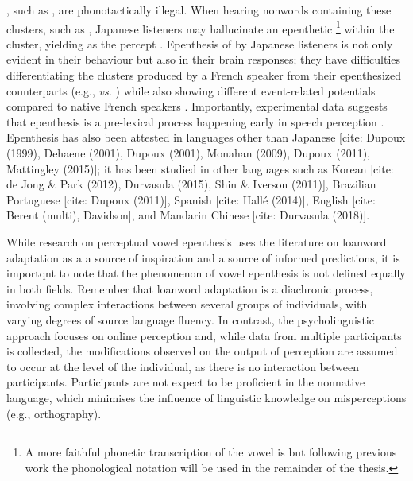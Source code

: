 , such as , are phonotactically illegal. When hearing nonwords containing these clusters, such as , Japanese listeners may hallucinate an epenthetic \footnote{A more faithful phonetic transcription of the vowel is \textipa{[W]} but following previous work the phonological notation  will be used in the remainder of the thesis.} within the cluster, yielding  as the percept \cite{dupoux1999}. Epenthesis of  by Japanese listeners is not only evident in their behaviour but also in their brain responses; they have difficulties differentiating the clusters produced by a French speaker from their epenthesized counterparts (e.g.,  \textit{vs.} ) while also showing different event-related potentials compared to native French speakers \cite{dehaene2000}. Importantly, experimental data suggests that epenthesis is a pre-lexical process happening early in speech perception \cite{dupoux2001}. 
Epenthesis has also been attested in languages other than Japanese [cite: Dupoux (1999), Dehaene (2001), Dupoux (2001), Monahan (2009), Dupoux (2011), Mattingley (2015)]; it has been studied in other languages such as Korean [cite: de Jong \& Park (2012), Durvasula (2015), Shin \& Iverson (2011)], Brazilian Portuguese [cite: Dupoux (2011)], Spanish [cite: Hallé (2014)], English [cite: Berent (multi), Davidson], and Mandarin Chinese [cite: Durvasula (2018)].

While research on perceptual vowel epenthesis uses the literature on loanword adaptation as a a source of inspiration and a source of informed predictions, it is importqnt to note that the phenomenon of vowel epenthesis is not defined equally in both fields. Remember that loanword adaptation is a diachronic process, involving complex interactions between several groups of individuals, with varying degrees of source language fluency. 
In contrast, the psycholinguistic approach focuses on online perception and, while data from multiple participants is collected, the modifications observed on the output of perception are assumed to occur at the level of the individual, as there is no interaction between participants. Participants are not expect to be proficient in the nonnative language, which minimises the influence of linguistic knowledge on misperceptions (e.g., orthography). 


